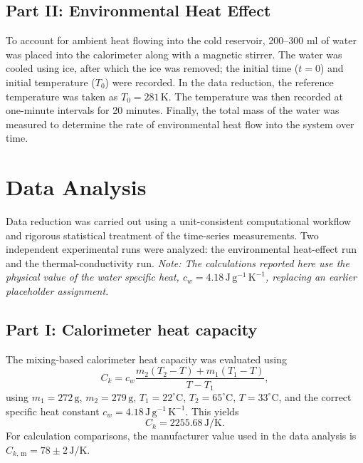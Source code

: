 \documentclass[journal]{IEEEtran}
\begin{document}
\subsection{Part II: Environmental Heat Effect}
To account for ambient heat flowing into the cold reservoir, 200--300 ml of water was placed into the calorimeter along with a magnetic stirrer. The water was cooled using ice, after which the ice was removed; the initial time ($t=0$) and initial temperature ($T_0$) were recorded. In the data reduction, the reference temperature was taken as $T_0 = 281\,\text{K}$. The temperature was then recorded at one-minute intervals for 20 minutes. Finally, the total mass of the water was measured to determine the rate of environmental heat flow into the system over time.

\section{Data Analysis}
Data reduction was carried out using a unit-consistent computational workflow and
rigorous statistical treatment of the time-series measurements. Two independent
experimental runs were analyzed: the environmental heat-effect run and the
thermal-conductivity run. \textit{Note: The calculations reported here use the physical value of the water specific heat,
$c_w = 4.18\,\text{J}\,\text{g}^{-1}\,\text{K}^{-1}$, replacing an earlier placeholder assignment.}

\subsection{Part I: Calorimeter heat capacity}
The mixing-based calorimeter heat capacity was evaluated using
\begin{equation}
    C_k = c_w \frac{m_2(T_2 - T) + m_1(T_1 - T)}{T - T_1},
\end{equation}
using $m_1=272\,\text{g}$, $m_2=279\,\text{g}$, $T_1=22^\circ\text{C}$, $T_2=65^\circ\text{C}$,
$T=33^\circ\text{C}$, and the correct specific heat constant
$c_w = 4.18\,\text{J}\,\text{g}^{-1}\,\text{K}^{-1}$. This yields
\begin{equation}
    C_k = 2255.68\,\text{J/K}.
\end{equation}
For calculation comparisons, the manufacturer value used in the data analysis is
$C_{k,\,\text{m}} = 78 \pm 2\,\text{J/K}$.
\end{document}
